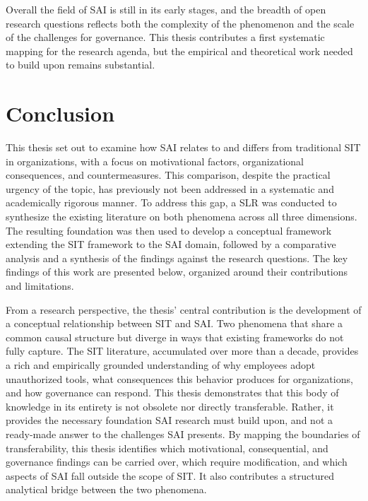 \documentclass[12pt,oneside]{article}
\begin{document}
Overall the field of \ac{SAI} is still in its early stages, and the breadth of open research questions reflects both the complexity of the phenomenon and the scale of the challenges for governance. This thesis contributes a first systematic mapping for the research agenda, but the empirical and theoretical work needed to build upon remains substantial.

\section{Conclusion} \label{conclusion}

This thesis set out to examine how \ac{SAI} relates to and differs from traditional \ac{SIT} in organizations, with a focus on motivational factors, organizational consequences, and countermeasures. This comparison, despite the practical urgency of the topic, has previously not been addressed in a systematic and academically rigorous manner. To address this gap, a \ac{SLR} was conducted to synthesize the existing literature on both phenomena across all three dimensions. The resulting foundation was then used to develop a conceptual framework extending the \ac{SIT} framework to the \ac{SAI} domain, followed by a comparative analysis and a synthesis of the findings against the research questions. The key findings of this work are presented below, organized around their contributions and limitations.

From a research perspective, the thesis' central contribution is the development of a conceptual relationship between \ac{SIT} and \ac{SAI}. Two phenomena that share a common causal structure but diverge in ways that existing frameworks do not fully capture. The \ac{SIT} literature, accumulated over more than a decade, provides a rich and empirically grounded understanding of why employees adopt unauthorized tools, what consequences this behavior produces for organizations, and how governance can respond. This thesis demonstrates that this body of knowledge in its entirety is not obsolete nor directly transferable. Rather, it provides the necessary foundation \ac{SAI} research must build upon, and not a ready-made answer to the challenges \ac{SAI} presents. By mapping the boundaries of transferability, this thesis identifies which motivational, consequential, and governance findings can be carried over, which require modification, and which aspects of \ac{SAI} fall outside the scope of \ac{SIT}. It also contributes a structured analytical bridge between the two phenomena.
\end{document}
